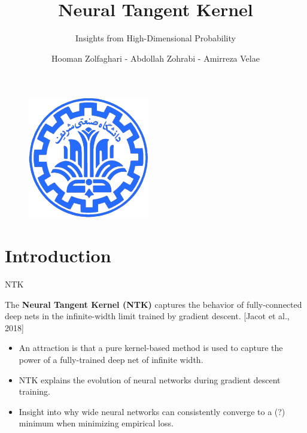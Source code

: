 \documentclass[serif, aspectratio=169]{beamer}
\author{Hooman Zolfaghari - Abdollah Zohrabi - Amirreza Velae}
\title{Neural Tangent Kernel}
\subtitle{Insights from High-Dimensional Probability}
\institute{
    Sharif University of Technology
}
\begin{document}
\begin{frame}
    \titlepage
    \vspace*{-0.6cm}
    \begin{figure}[htpb]
        \begin{center}
            \includegraphics[keepaspectratio, scale=0.25]{pic/sharif-main-logo.png}
        \end{center}
    \end{figure}
\end{frame}

\begin{frame}    
\tableofcontents[sectionstyle=show,
subsectionstyle=show/shaded/hide,
subsubsectionstyle=show/shaded/hide]
\end{frame}

\section{Introduction}

\begin{frame}{NTK}
	
	The \textbf{Neural Tangent Kernel (NTK)} captures the behavior of fully-connected
	deep nets in the infinite-width limit trained by gradient descent. [Jacot et al., 2018]
	
	\begin{itemize}
		\item  An attraction is that a pure
		kernel-based method is used to capture the power of a fully-trained deep net of
		infinite width.
		
		
		\item NTK explains the evolution of neural networks during gradient descent training.
		\item Insight into why wide neural networks can consistently converge to a 
		(?) minimum when minimizing empirical loss.
	\end{itemize}
\end{frame}
\end{document}
